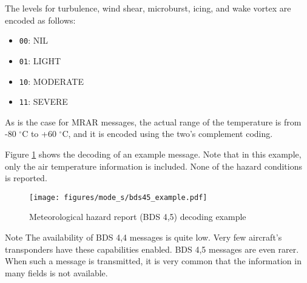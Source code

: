 The levels for turbulence, wind shear, microburst, icing, and wake vortex are encoded as follows:
\begin{itemize}
  \item \texttt{00}: NIL
  \item \texttt{01}: LIGHT
  \item \texttt{10}: MODERATE
  \item \texttt{11}: SEVERE
\end{itemize}

As is the case for MRAR messages, the actual range of the temperature is from -80 $^\circ$C to +60 $^\circ$C, and it is encoded using the two's complement coding.

Figure \ref{fig:bds45_example} shows the decoding of an example message. Note that in this example, only the air temperature information is included. None of the hazard conditions is reported.

\begin{figure}[ht]
  \centering
  \texttt{[image: figures/mode\_s/bds45\_example.pdf]}
  \caption{Meteorological hazard report (BDS 4,5) decoding example}
  \label{fig:bds45_example}
\end{figure}


\begin{notebox}{Note}
The availability of BDS 4,4 messages is quite low. Very few aircraft's transponders have these capabilities enabled. BDS 4,5 messages are even rarer. When such a message is transmitted, it is very common that the information in many fields is not available.
\end{notebox}

